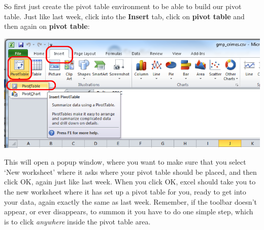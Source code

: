 \documentclass[]{book}
\theoremstyle{definition}
\theoremstyle{definition}
\theoremstyle{definition}
\theoremstyle{remark}
\begin{document}
So first just create the pivot table environment to be able to build our
pivot table. Just like last week, click into the \textbf{Insert} tab,
click on \textbf{pivot table} and then again on \textbf{pivot table}:

\includegraphics{imgs/click_pivot.png}

This will open a popup window, where you want to make sure that you
select `New worksheet' where it asks where your pivot table should be
placed, and then click OK, again just like last week. When you click OK,
excel should take you to the new worksheet where it has set up a pivot
table for you, ready to get into your data, again exactly the same as
last week. Remember, if the toolbar doesn't appear, or ever disappears,
to summon it you have to do one simple step, which is to click
\emph{anywhere} inside the pivot table area.
\end{document}

